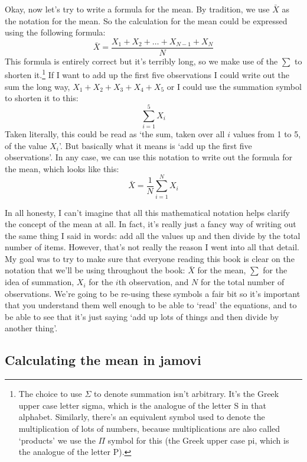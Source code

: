 \documentclass[
]{book}
\begin{document}
Okay, now let's try to write a formula for the mean. By tradition, we use \(\bar{X}\) as the notation for the mean. So the calculation for the mean could be expressed using the following formula:
\[
\bar{X} = \frac{X_1 + X_2 + \ldots + X_{N-1} + X_N}{N}
\]
This formula is entirely correct but it's terribly long, so we make use of the  \(\scriptstyle\sum\) to shorten it.\footnote{The choice to use \(\Sigma\) to denote summation isn't arbitrary. It's the Greek upper case letter sigma, which is the analogue of the letter S in that alphabet. Similarly, there's an equivalent symbol used to denote the multiplication of lots of numbers, because multiplications are also called `products' we use the \(\Pi\) symbol for this (the Greek upper case pi, which is the analogue of the letter P).} If I want to add up the first five observations I could write out the sum the long way, \(X_1 + X_2 + X_3 + X_4 +X_5\) or I could use the summation symbol to shorten it to this:
\[
\sum_{i=1}^5 X_i
\]
Taken literally, this could be read as `the sum, taken over all \(i\) values from 1 to 5, of the value \(X_i\)'. But basically what it means is `add up the first five observations'. In any case, we can use this notation to write out the formula for the mean, which looks like this:
\[
\bar{X} = \frac{1}{N} \sum_{i=1}^N X_i 
\]

In all honesty, I can't imagine that all this mathematical notation helps clarify the concept of the mean at all. In fact, it's really just a fancy way of writing out the same thing I said in words: add all the values up and then divide by the total number of items. However, that's not really the reason I went into all that detail. My goal was to try to make sure that everyone reading this book is clear on the notation that we'll be using throughout the book: \(\bar{X}\) for the mean, \(\scriptstyle\sum\) for the idea of summation, \(X_i\) for the \(i\)th observation, and \(N\) for the total number of observations. We're going to be re-using these symbols a fair bit so it's important that you understand them well enough to be able to `read' the equations, and to be able to see that it's just saying `add up lots of things and then divide by another thing'.

\hypertarget{calculating-the-mean-in-jamovi}{%
\subsection{Calculating the mean in jamovi}\label{calculating-the-mean-in-jamovi}}
\end{document}
